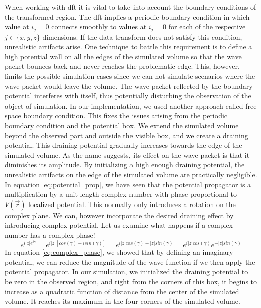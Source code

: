 When working with \acrshort{dft} it is vital to take into account the boundary conditions of the transformed region.
The \acrshort{dft} implies a periodic boundary condition in which value at $i_j = 0$ connects smoothly to values at $i_j = 0$ for each of the respective $j \in \{x, y, z\}$ dimensions.
If the data transform does not satisfy this condition, unrealistic artifacts arise.
One technique to battle this requirement is to define a high potential wall on all the edges of the simulated volume so that the wave packet bounces back and never reaches the problematic edge.
This, however, limits the possible simulation cases since we can not simulate scenarios where the wave packet would leave the volume.
The wave packet reflected by the boundary potential interferes with itself, thus potentially disturbing the observation of the object of simulation.
In our implementation, we used another approach called free space boundary condition.
This fixes the issues arising from the periodic boundary condition and the potential box.
We extend the simulated volume beyond the observed part and outside the visible box, and we create a draining potential.
This draining potential gradually increases towards the edge of the simulated volume.
As the name suggests, its effect on the wave packet is that it diminishes its amplitude.
By initializing a high enough draining potential, the unrealistic artifacts on the edge of the simulated volume are practically negligible.
In equation \ref{eq:potential_prop}, we have seen that the potential propagator is a multiplication by a unit length complex number with phase proportional to $V(\vec{r})$ localized potential.
This normally only introduces a rotation on the complex plane.
We can, however incorporate the desired draining effect by introducing complex potential.
Let us examine what happens if a complex number has a complex phase!
\begin{equation}
	\label{eq:complex_phase}
	e^{i |z|e^{i\gamma}} = e^{i|z|\left[cos(\gamma) + isin(\gamma)\right]} = e^{i|z|cos(\gamma) - |z|sin(\gamma)}
	= e^{i|z|cos(\gamma)}e^{-|z|sin(\gamma)}
\end{equation}
In equation \ref{eq:complex_phase}, we showed that by defining an imaginary potential, we can reduce the magnitude of the wave function if we then apply the potential propagator.
In our simulation, we initialized the draining potential to be zero in the observed region, and right from the corners of this box, it begins to increase as a quadratic function of distance from the center of the simulated volume.
It reaches its maximum in the four corners of the simulated volume.


